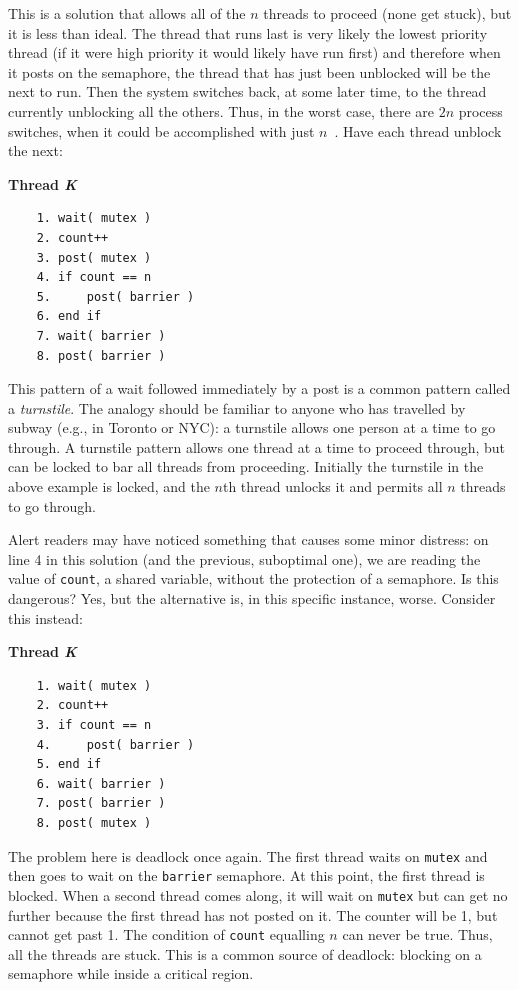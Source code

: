 \documentclass[a4paper]{report}
\begin{document}
This is a solution that allows all of the $n$ threads to proceed (none get stuck), but it is less than ideal. The thread that runs last is very likely the lowest priority thread (if it were high priority it would likely have run first) and therefore when it posts on the semaphore, the thread that has just been unblocked will be the next to run. Then the system switches back, at some later time, to the thread currently unblocking all the others. Thus, in the worst case, there are $2n$ process switches, when it could be accomplished with just $n$~\cite{mte241}. Have each thread unblock the next:

\textbf{Thread \textit{K}}\vspace{-2em}
\begin{verbatim}
	1. wait( mutex )
	2. count++
	3. post( mutex )
	4. if count == n
	5.     post( barrier )
	6. end if
	7. wait( barrier )
	8. post( barrier )
  \end{verbatim}
\vspace{-2em}

This pattern of a wait followed immediately by a post is a common pattern called a \textit{turnstile}. The analogy should be familiar to anyone who has travelled by subway (e.g., in Toronto or NYC): a turnstile allows one person at a time to go through. A turnstile pattern allows one thread at a time to proceed through, but can be locked to bar all threads from proceeding. Initially the turnstile in the above example is locked, and the $n$th thread unlocks it and permits all $n$ threads to go through.

Alert readers may have noticed something that causes some minor distress: on line 4 in this solution (and the previous, suboptimal one), we are reading the value of \texttt{count}, a shared variable, without the protection of a semaphore. Is this dangerous? Yes, but the alternative is, in this specific instance, worse. Consider this instead:

\textbf{Thread \textit{K}}\vspace{-2em}
\begin{verbatim}
	1. wait( mutex )
	2. count++
	3. if count == n
	4.     post( barrier )
	5. end if
	6. wait( barrier )
	7. post( barrier )
	8. post( mutex )
  \end{verbatim}
\vspace{-2em}

The problem here is deadlock once again. The first thread waits on \texttt{mutex} and then goes to wait on the \texttt{barrier} semaphore. At this point, the first thread is blocked. When a second thread comes along, it will wait on \texttt{mutex} but can get no further because the first thread has not posted on it. The counter will be 1, but cannot get past 1. The condition of \texttt{count} equalling $n$ can never be true. Thus, all the threads are stuck. This is a common source of deadlock: blocking on a semaphore while inside a critical region.
\end{document}
